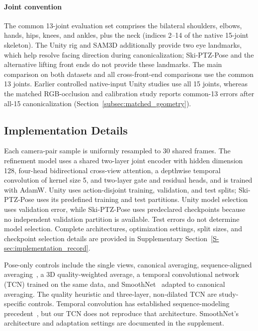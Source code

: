 \documentclass[preprint,12pt]{elsarticle}
\begin{document}
\paragraph{Joint convention}
The common 13-joint evaluation set comprises the bilateral shoulders, elbows, hands, hips, knees, and ankles, plus the neck (indices 2--14 of the native 15-joint skeleton). The Unity rig and SAM3D additionally provide two eye landmarks, which help resolve facing direction during canonicalization; Ski-PTZ-Pose and the alternative lifting front ends do not provide these landmarks. The main comparison on both datasets and all cross-front-end comparisons use the common 13 joints. Earlier controlled native-input Unity studies use all 15 joints, whereas the matched RGB-occlusion and calibration study reports common-13 errors after all-15 canonicalization (Section~\ref{subsec:matched_geometry}).

\subsection{Implementation Details}
\label{subsec:implementation_details}

Each camera-pair sample is uniformly resampled to 30 shared frames. The refinement model uses a shared two-layer joint encoder with hidden dimension 128, four-head bidirectional cross-view attention, a depthwise temporal convolution of kernel size 5, and two-layer gate and residual heads, and is trained with AdamW. Unity uses action-disjoint training, validation, and test splits; Ski-PTZ-Pose uses its predefined training and test partitions. Unity model selection uses validation error, while Ski-PTZ-Pose uses predeclared checkpoints because no independent validation partition is available. Test errors do not determine model selection. Complete architectures, optimization settings, split sizes, and checkpoint selection details are provided in Supplementary Section~\ref{S-sec:implementation_record}.

Pose-only controls include the single views, canonical averaging, sequence-aligned averaging~\cite{umeyama1991least}, a 3D quality-weighted average, a temporal convolutional network (TCN) trained on the same data, and SmoothNet~\cite{zeng2022smoothnet} adapted to canonical averaging. The quality heuristic and three-layer, non-dilated TCN are study-specific controls. Temporal convolution has established sequence-modeling precedent~\cite{bai2018empirical}, but our TCN does not reproduce that architecture. SmoothNet's architecture and adaptation settings are documented in the supplement.
\end{document}
